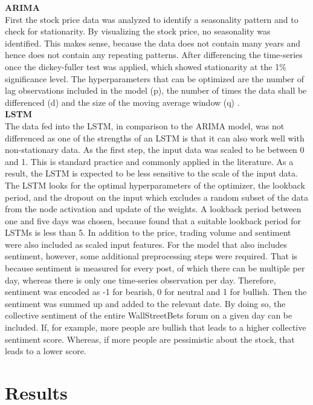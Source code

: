 \documentclass[11pt, a4paper]{article}
\begin{document}
\noindent\textbf{ARIMA}\\
First the stock price data was analyzed to identify a seasonality pattern and to check for stationarity.
By visualizing the stock price, no seasonality was identified. This makes sense, because the data does not contain many years and
hence does not contain any repeating patterns.
After differencing the time-series once the dickey-fuller test was applied, which showed stationarity at the 1\% significance level.
The hyperparameters that can be optimized are the number of lag observations
included in the model (p), the number of times the data shall be differenced (d) and the size of the moving average window (q) \citep{sima2018timeseries}.\\

\noindent\textbf{LSTM}\\
The data fed into the LSTM, in comparison to the ARIMA model, was not differenced as one of the strengths of an LSTM is that it can also work well with non-stationary data.
As the first step, the input data was scaled to be between 0 and 1. This is standard practice and commonly applied in the literature. As a result, the LSTM is expected to be
less sensitive to the scale of the input data.
The LSTM looks for the optimal hyperparameters of the optimizer, the lookback period, and the dropout on the input which excludes a random subset of the data from the node activation and update of the weights.
A lookback period between one and five days was chosen, because \cite{saud2020lookback} found that a suitable lookback period for LSTMs is less than 5. 
In addition to the price, trading volume and sentiment were also included as scaled input features.
For the model that also includes sentiment, however, some additional preprocessing steps were required. That is because sentiment is measured for every post, of which there
can be multiple per day, whereas there is only one time-series observation per day.
Therefore, sentiment was encoded as -1 for bearish, 0 for neutral and 1 for bullish. Then the sentiment was summed up and added
to the relevant date. 
By doing so, the collective sentiment of the entire WallStreetBets forum on a given day can be included. 
If, for example, more people are bullish that leads to a higher collective sentiment score.
Whereas, if more people are pessimistic about the stock, that leads to a lower score.



\section{Results}
\end{document}
